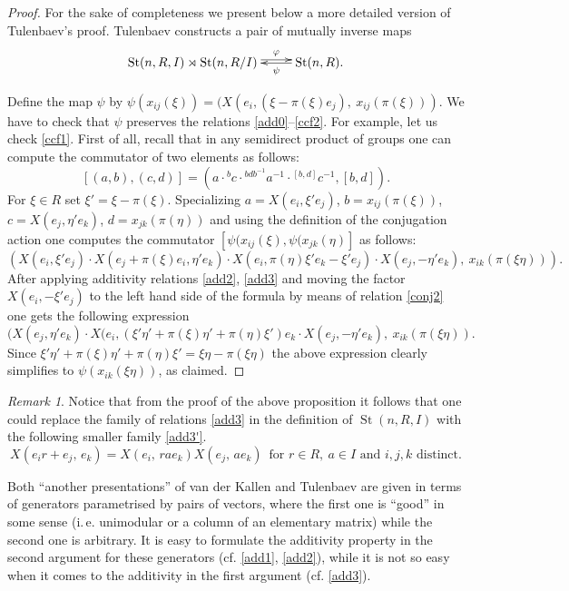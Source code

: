 \documentclass[11pt]{amsart}
\theoremstyle{plain} \declaretheorem[name=Theorem, Refname={Theorem,Theorems}]{tm} \Crefname{tm}{Theorem}{Theorems}
\numberwithin{equation}{section}
\theoremstyle{definition} \newtheorem{df}[lm]{Definition} \Crefname{df}{Definition}{Definitions}
\theoremstyle{remark} \newtheorem{rk}[lm]{Remark} \Crefname{rk}{Remark}{Remarks}
\newcommand{\St}{\mathop{\mathrm{St}}\nolimits}
\begin{document}
\begin{proof} For the sake of completeness we present below a more detailed version of Tulenbaev's proof.
Tulenbaev constructs a pair of mutually inverse maps
$$\xymatrix{ \St(n, R, I) \rtimes \St(n, R/I) \ar@<0.6ex>[r]^-\varphi &  \ar[l]^-\psi \St(n, R).}$$

Define the map $\psi$ by $\psi(x_{ij}(\xi)) = (X(e_i, (\xi - \pi(\xi)e_j),\ x_{ij}(\pi(\xi)))$. 
We have to check that $\psi$ preserves the relations \eqref{add0}--\eqref{ccf2}.
For example, let us check \eqref{ccf1}. 
First of all, recall that in any semidirect product of groups one can compute the commutator of two elements as follows:
$$[(a, b), (c, d)] = (a \cdot {}^bc \cdot {}^{bdb^{-1}}a^{-1} \cdot {}^{[b, d]}c^{-1} , [b, d]).$$
For $\xi\in R$ set $\xi' = \xi - \pi(\xi)$.
Specializing $a = X(e_i, \xi' e_j)$, $b = x_{ij}(\pi(\xi))$, $c = X(e_j, \eta'e_k)$, $d = x_{jk}(\pi(\eta))$ and using the definition of the conjugation action 
one computes the commutator $[\psi(x_{ij}(\xi), \psi(x_{jk}(\eta)]$ as follows:
$$\left(X(e_i, \xi' e_j) \cdot X(e_j + \pi(\xi)e_i, \eta'e_k) \cdot X(e_i, \pi(\eta)\xi' e_k - \xi' e_j) \cdot X(e_j, -\eta'e_k),\ x_{ik}(\pi(\xi\eta))\right).$$
After applying additivity relations \eqref{add2}, \eqref{add3} and moving the factor $X(e_i, -\xi' e_j)$ to the left hand side of the formula by means of relation \eqref{conj2}
one gets the following expression
$$(X(e_j, \eta'e_k) \cdot X(e_i, (\xi' \eta' + \pi(\xi)\eta' + \pi(\eta)\xi')e_k \cdot X(e_j, -\eta'e_k),\ x_{ik}(\pi(\xi\eta)).$$
Since $\xi'\eta' + \pi(\xi)\eta' + \pi(\eta)\xi' = \xi\eta - \pi(\xi\eta)$ the above expression clearly simplifies to $\psi(x_{ik}(\xi\eta))$, as claimed.
\end{proof}

\begin{rk} \label{rk:T123'} Notice that from the proof of the above proposition it follows that one could replace the family of relations \eqref{add3}
in the definition of $\St(n, R, I)$ with the following smaller family \eqref{add3'}.
\setcounter{equation}{2} \renewcommand{\theequation}{T\arabic{equation}'}
\begin{equation} X(e_ir+e_j,\,e_k)=X(e_i,\,rae_k)X(e_j,\,ae_k)\,\text{ for }r\in R,\ a\in I\text{ and } i,j,k\text{ distinct}. \label{add3'} \end{equation} \end{rk}

Both ``another presentations'' of van der Kallen and Tulenbaev are given in terms of generators parametrised by pairs of vectors,
 where the first one is ``good'' in some sense  (i.\,e. unimodular or a column of an elementary matrix) while the second one is arbitrary.
It is easy to formulate the additivity property in the second argument for these generators (cf. \eqref{add1}, \eqref{add2}),
while it is not so easy when it comes to the additivity in the first argument (cf. \eqref{add3}).
\end{document}
